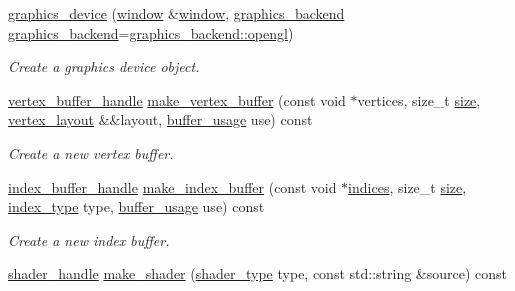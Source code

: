 \begin{DoxyCompactItemize}
\mbox{\hyperlink{classmoka_1_1graphics__device_aa2e8bc278a52e16d3c5b887f67496236}{graphics\+\_\+device}} (\mbox{\hyperlink{classmoka_1_1window}{window}} \&\mbox{\hyperlink{classmoka_1_1window}{window}}, \mbox{\hyperlink{namespacemoka_a6d27be7986842909ecfb039004d3f9e9}{graphics\+\_\+backend}} \mbox{\hyperlink{namespacemoka_a6d27be7986842909ecfb039004d3f9e9}{graphics\+\_\+backend}}=\mbox{\hyperlink{namespacemoka_a6d27be7986842909ecfb039004d3f9e9a6785e6b975db5d7cf223101ef1bc2f6f}{graphics\+\_\+backend\+::opengl}})
\begin{DoxyCompactList}\small\item\em Create a graphics device object. \end{DoxyCompactList}\item 
\mbox{\hyperlink{structmoka_1_1vertex__buffer__handle}{vertex\+\_\+buffer\+\_\+handle}} \mbox{\hyperlink{classmoka_1_1graphics__device_afa6c6199f0e97574ab15bfcb806fa9ec}{make\+\_\+vertex\+\_\+buffer}} (const void $\ast$vertices, size\+\_\+t \mbox{\hyperlink{namespacemoka_a4f125ee95d9889b23c3259d1fba4c2e4}{size}}, \mbox{\hyperlink{classmoka_1_1vertex__layout}{vertex\+\_\+layout}} \&\&layout, \mbox{\hyperlink{namespacemoka_a4799e695da8b173f75809387af8abed7}{buffer\+\_\+usage}} use) const
\begin{DoxyCompactList}\small\item\em Create a new vertex buffer. \end{DoxyCompactList}\item 
\mbox{\hyperlink{structmoka_1_1index__buffer__handle}{index\+\_\+buffer\+\_\+handle}} \mbox{\hyperlink{classmoka_1_1graphics__device_a5756933e283104ae19a8c87f970bdc80}{make\+\_\+index\+\_\+buffer}} (const void $\ast$\mbox{\hyperlink{namespacemoka_a16a7bd7fc66f698dfcaf9bca1312a2bbaa51a528f35c02157e603a20c8796a684}{indices}}, size\+\_\+t \mbox{\hyperlink{namespacemoka_a4f125ee95d9889b23c3259d1fba4c2e4}{size}}, \mbox{\hyperlink{namespacemoka_a32244b0de63481283738e2db11639e3f}{index\+\_\+type}} type, \mbox{\hyperlink{namespacemoka_a4799e695da8b173f75809387af8abed7}{buffer\+\_\+usage}} use) const
\begin{DoxyCompactList}\small\item\em Create a new index buffer. \end{DoxyCompactList}\item 
\mbox{\hyperlink{structmoka_1_1shader__handle}{shader\+\_\+handle}} \mbox{\hyperlink{classmoka_1_1graphics__device_a57c1ea7dbffea043783a1e6dc17fc591}{make\+\_\+shader}} (\mbox{\hyperlink{namespacemoka_a472008f32e5db526d38eace7d3e45772}{shader\+\_\+type}} type, const std\+::string \&source) const

\end{DoxyCompactItemize}
